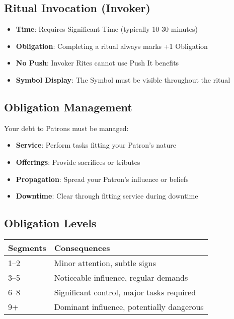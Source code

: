 \subsection*{Ritual Invocation (Invoker)}
\begin{itemize}
\item \textbf{Time}: Requires Significant Time (typically 10-30 minutes)
\item \textbf{Obligation}: Completing a ritual always marks +1 Obligation
\item \textbf{No Push}: Invoker Rites cannot use Push It benefits
\item \textbf{Symbol Display}: The Symbol must be visible throughout the ritual
\end{itemize}

\subsection*{Obligation Management}
Your debt to Patrons must be managed:
\begin{itemize}
\item \textbf{Service}: Perform tasks fitting your Patron's nature
\item \textbf{Offerings}: Provide sacrifices or tributes
\item \textbf{Propagation}: Spread your Patron's influence or beliefs
\item \textbf{Downtime}: Clear through fitting service during downtime
\end{itemize}

\subsection*{Obligation Levels}
\begin{center}
\small
\begin{tabular}{ll}
\toprule
\textbf{Segments} & \textbf{Consequences} \\
\midrule
1--2 & Minor attention, subtle signs \\
3--5 & Noticeable influence, regular demands \\
6--8 & Significant control, major tasks required \\
9+   & Dominant influence, potentially dangerous \\
\bottomrule
\end{tabular}
\end{center}

